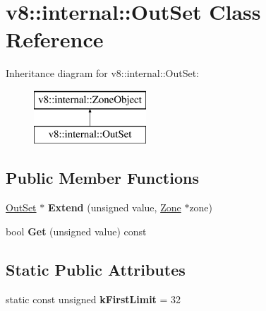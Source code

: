\hypertarget{classv8_1_1internal_1_1_out_set}{}\section{v8\+:\+:internal\+:\+:Out\+Set Class Reference}
\label{classv8_1_1internal_1_1_out_set}
Inheritance diagram for v8\+:\+:internal\+:\+:Out\+Set\+:\begin{figure}[H]
\begin{center}
\leavevmode
\includegraphics[height=2.000000cm]{classv8_1_1internal_1_1_out_set}
\end{center}
\end{figure}
\subsection*{Public Member Functions}
\begin{DoxyCompactItemize}
\item 
\hyperlink{classv8_1_1internal_1_1_out_set}{Out\+Set} $\ast$ {\bfseries Extend} (unsigned value, \hyperlink{classv8_1_1internal_1_1_zone}{Zone} $\ast$zone)\hypertarget{classv8_1_1internal_1_1_out_set_aa6bc55c84c74372ed1fc4e05019d832f}{}\label{classv8_1_1internal_1_1_out_set_aa6bc55c84c74372ed1fc4e05019d832f}

\item 
bool {\bfseries Get} (unsigned value) const \hypertarget{classv8_1_1internal_1_1_out_set_a28cdeaa3e46526dd1269d8ab24838844}{}\label{classv8_1_1internal_1_1_out_set_a28cdeaa3e46526dd1269d8ab24838844}

\end{DoxyCompactItemize}
\subsection*{Static Public Attributes}
\begin{DoxyCompactItemize}
\item 
static const unsigned {\bfseries k\+First\+Limit} = 32\hypertarget{classv8_1_1internal_1_1_out_set_ae14ea3db294239b6b919d9bb2b42f82c}{}\label{classv8_1_1internal_1_1_out_set_ae14ea3db294239b6b919d9bb2b42f82c}

\end{DoxyCompactItemize}
